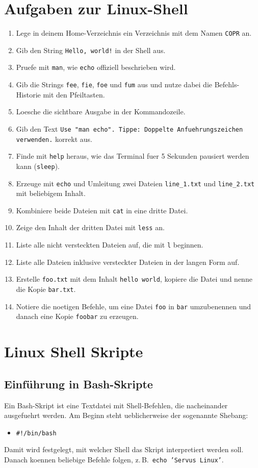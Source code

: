 \documentclass[11pt, oneside, numbers=noenddot]{scrbook}
\begin{document}
\chapter{Aufgaben zur Linux-Shell}
\begin{enumerate}
\item Lege in deinem Home-Verzeichnis ein Verzeichnis mit dem Namen \texttt{COPR} an.
\item Gib den String \texttt{Hello, world!} in der Shell aus.
\item Pruefe mit \texttt{man}, wie \texttt{echo} offiziell beschrieben wird.
\item Gib die Strings \texttt{fee}, \texttt{fie}, \texttt{foe} und \texttt{fum} aus und nutze dabei die Befehls-Historie mit den Pfeiltasten.
\item Loesche die sichtbare Ausgabe in der Kommandozeile.
\item Gib den Text \texttt{Use "man echo". Tippe: Doppelte Anfuehrungszeichen verwenden.} korrekt aus.
\item Finde mit \texttt{help} heraus, wie das Terminal fuer 5 Sekunden pausiert werden kann (\texttt{sleep}).
\item Erzeuge mit \texttt{echo} und Umleitung zwei Dateien \texttt{line\_1.txt} und \texttt{line\_2.txt} mit beliebigem Inhalt.
\item Kombiniere beide Dateien mit \texttt{cat} in eine dritte Datei.
\item Zeige den Inhalt der dritten Datei mit \texttt{less} an.
\item Liste alle nicht versteckten Dateien auf, die mit \texttt{l} beginnen.
\item Liste alle Dateien inklusive versteckter Dateien in der langen Form auf.
\item Erstelle \texttt{foo.txt} mit dem Inhalt \texttt{hello world}, kopiere die Datei und nenne die Kopie \texttt{bar.txt}.
\item Notiere die noetigen Befehle, um eine Datei \texttt{foo} in \texttt{bar} umzubenennen und danach eine Kopie \texttt{foobar} zu erzeugen.
\end{enumerate}

\chapter{Linux Shell Skripte}
\section{Einführung in Bash-Skripte}
Ein Bash-Skript ist eine Textdatei mit Shell-Befehlen, die nacheinander ausgefuehrt werden. Am Beginn steht ueblicherweise der sogenannte Shebang:
\begin{itemize}
\item \texttt{\#!/bin/bash}
\end{itemize}
Damit wird festgelegt, mit welcher Shell das Skript interpretiert werden soll. Danach koennen beliebige Befehle folgen, z.\,B.\ \texttt{echo 'Servus Linux'}.
\end{document}
